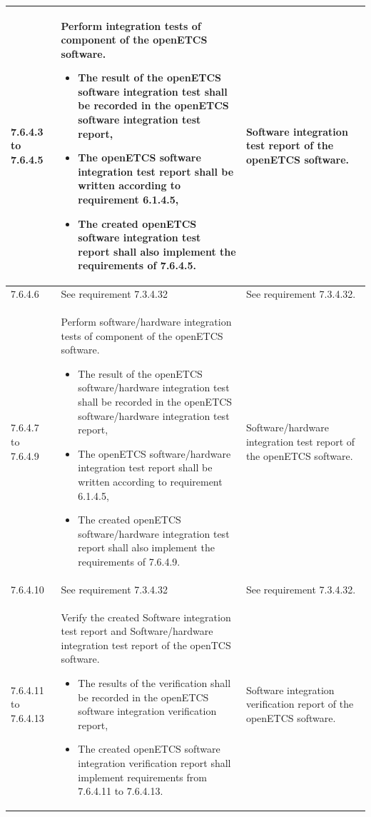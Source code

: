 \documentclass{template/openetcs_report}
\begin{document}
{\begin{longtable}{|p{2cm}|p{9cm}|p{3cm}|}
7.6.4.3 to 7.6.4.5 & Perform integration tests of component of the openETCS software.
\begin{itemize}\itemsep=0pt
  \item The result of the openETCS software integration test shall be recorded in the openETCS software integration test report,
  \item The openETCS software integration test report shall be written according to requirement 6.1.4.5, 
  \item The created openETCS software integration test report shall also implement the requirements of 7.6.4.5.
\end{itemize}
& Software integration test report of the openETCS software.\\ 
\hline
7.6.4.6 & See requirement 7.3.4.32 & See requirement 7.3.4.32.\\ 
\hline
7.6.4.7 to 7.6.4.9 & Perform software/hardware integration tests of component of the openETCS software.
\begin{itemize}\itemsep=0pt
  \item The result of the openETCS software/hardware integration test shall be recorded in the openETCS software/hardware integration test report,
  \item The openETCS software/hardware integration test report shall be written according to requirement 6.1.4.5, 
  \item The created openETCS software/hardware integration test report shall also implement the requirements of 7.6.4.9.
\end{itemize}
& Software/hardware integration test report of the openETCS software.\\ 
\hline
7.6.4.10 & See requirement 7.3.4.32 & See requirement 7.3.4.32.\\ 
\hline
7.6.4.11 to 7.6.4.13 & Verify the created Software integration test report and Software/hardware integration test report of the openTCS software.
\begin{itemize}\itemsep=0pt
  \item The results of the verification shall be recorded in the openETCS software integration verification report,
  \item The created openETCS software integration verification report shall implement requirements from 7.6.4.11 to 7.6.4.13. 
\end{itemize}
& Software integration verification report of the openETCS software.\\ 
\hline
\end{longtable}}
\end{document}
